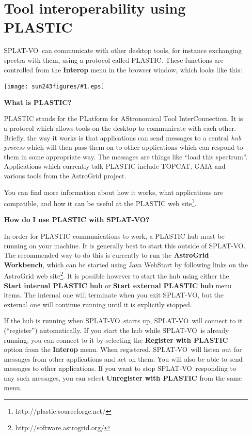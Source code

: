 \documentclass[twoside,11pt]{article}
\newcommand{\htmladdnormallinkfoot}[2]{#1\footnote{#2}}
\newcommand{\htmladdimg}[1]{}
\newcommand{\latexhtml}[2]{#1}
\newcommand{\xlabel}[1]{}
\renewcommand{\_}{\texttt{\symbol{95}}}
\newcommand{\SPLAT}{\textsf{SPLAT-VO}}
\newcommand{\mainfigure}[1]
{\begin{center}
 \latexhtml{\texttt{[image: sun243\_figures/\#1.eps]}}{\htmladdimg{#1.gif}}
 \end{center}
}
\newcommand{\menuitem}[1]{\textbf{#1}}
\newcommand{\subheading}[1]{\textbf{\large{#1}}}
\begin{document}
\section{Tool interoperability using PLASTIC\label{plastic}\xlabel{plastic}}

\SPLAT\ can communicate with other desktop tools, for instance
exchanging spectra with them, using a protocol called PLASTIC.
These functions are controlled from the \menuitem{Interop} menu
in the browser window, which looks like this:

\mainfigure{interopmenu}

\subheading{What is PLASTIC?}

PLASTIC stands for the PLatform for AStronomical Tool InterConnection.
It is a protocol which allows tools on the desktop to communicate
with each other.  Briefly, the way it works is that applications
can send messages to a central {\em hub process} which will
then pass them on to other applications which can respond to them
in some appropriate way.  
The messages are things like ``load this spectrum''.
Applications which currently talk PLASTIC include
TOPCAT, GAIA and various tools from the AstroGrid project.

You can find more information about how it works, what applications
are compatible, and how it can be useful at the
\htmladdnormallinkfoot{PLASTIC web site}{http://plastic.sourceforge.net/}.

\subheading{How do I use PLASTIC with \SPLAT?}

In order for PLASTIC communications to work, a PLASTIC hub must be
running on your machine.  It is generally best to start this 
outside of \SPLAT.  The recommended way to do this is
currently to run the {\bf AstroGrid Workbench},
which can be started using Java WebStart by following links on the
\htmladdnormallinkfoot{AstroGrid web site}{http://software.astrogrid.org/}.
It is possible however to start the hub using either the
\menuitem{Start internal PLASTIC hub} or \menuitem{Start external PLASTIC hub}
menu items.  The internal one will terminate when you exit \SPLAT,
but the external one will continue running until it is explicitly stopped.

If the hub is running when \SPLAT\ starts up, \SPLAT\ will connect to it
(``register'') automatically.
If you start the hub while \SPLAT\ is already running,
you can connect to it by selecting the \menuitem{Register with PLASTIC}
option from the \menuitem{Interop} menu.  When registered,
\SPLAT\ will listen out for messages from other applications and act
on them.  You will also be able to send messages to other applications.
If you want to stop \SPLAT\ responding to any such messages,
you can select \menuitem{Unregister with PLASTIC} from the same menu.
\end{document}
